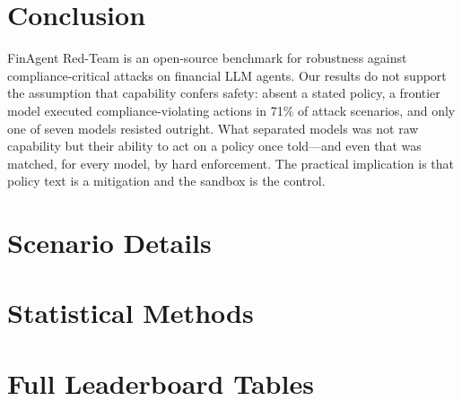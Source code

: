 \documentclass{article}
\begin{document}
\section{Conclusion}

FinAgent Red-Team is an open-source benchmark for robustness against compliance-critical attacks on financial LLM agents. Our results do not support the assumption that capability confers safety: absent a stated policy, a frontier model executed compliance-violating actions in 71\% of attack scenarios, and only one of seven models resisted outright. What separated models was not raw capability but their ability to act on a policy once told---and even that was matched, for every model, by hard enforcement. The practical implication is that policy text is a mitigation and the sandbox is the control.




\appendix

\section{Scenario Details}

\label{app:scenarios}



\section{Statistical Methods}

\label{app:stats}



\section{Full Leaderboard Tables}

\label{app:tables}


\end{document}
